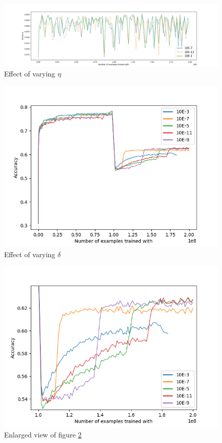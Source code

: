 \documentclass[12pt]{article}
\begin{document}
\begin{figure}
	
	\centering
	\includegraphics[width=1.6\linewidth, center]{./img/pc_etas.png}
	\caption{Effect of varying $\eta$}
	\label{fig:pc_etas}	
\end{figure}
\begin{figure}
	\centering
	\includegraphics[width=.8\linewidth]{./img/vfdt_deltas.png}
	\caption{Effect of varying $\delta$}
	\label{fig:vfdt_deltas}	
\end{figure}
\begin{figure}
	\centering
	\includegraphics[width=.8\linewidth]{./img/vfdt_delta_zoom.png}
	\caption{Enlarged view of figure \ref{fig:vfdt_deltas}}
	\label{fig:vfdt_delta_zoom}	
\end{figure}
\end{document}

